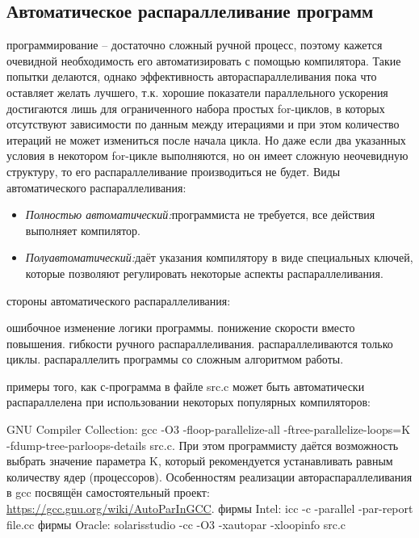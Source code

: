 { %
	\subsection{Автоматическое распараллеливание программ}
	 программирование – достаточно сложный ручной процесс, поэтому кажется очевидной необходимость его автоматизировать с помощью компилятора. Такие попытки делаются, однако эффективность автораспараллеливания пока что оставляет желать лучшего, т.к. хорошие показатели параллельного ускорения достигаются лишь для ограниченного набора простых for-циклов, в которых отсутствуют зависимости по данным между итерациями и при этом количество итераций не может измениться после начала цикла. Но даже если два указанных условия в некотором for-цикле выполняются, но он имеет сложную неочевидную структуру, то его распараллеливание производиться не будет. Виды автоматического распараллеливания:
	\begin{itemize}
		\item\textit{Полностью автоматический:} программиста не требуется, все действия выполняет компилятор.
		\item\textit{Полуавтоматический:} даёт указания компилятору в виде специальных ключей, которые позволяют регулировать некоторые аспекты распараллеливания.
	\end{itemize}
	 стороны автоматического распараллеливания:
	\begin{itemize}
		 ошибочное изменение логики программы.
		 понижение скорости вместо повышения.
		 гибкости ручного распараллеливания.
		 распараллеливаются только циклы.
		 распараллелить программы со сложным алгоритмом работы.
	\end{itemize}
	 примеры того, как с-программа в файле src.c может быть автоматически распараллелена при использовании некоторых популярных компиляторов:
	\begin{itemize}
		 GNU Compiler Collection:	 
gcc -O3 -floop-parallelize-all -ftree-parallelize-loops=K -fdump-tree-parloops-details src.c. При этом программисту даётся возможность выбрать значение параметра K, который рекомендуется устанавливать равным количеству ядер (процессоров). Особенностям реализации автораспараллеливания в gcc посвящён самостоятельный проект:\\ \url{https://gcc.gnu.org/wiki/AutoParInGCC}. 
		 фирмы Intel:	 
icc -c -parallel -par-report file.cc
		 фирмы Oracle:	 
solarisstudio -cc -O3 -xautopar -xloopinfo src.c
	\end{itemize}
}